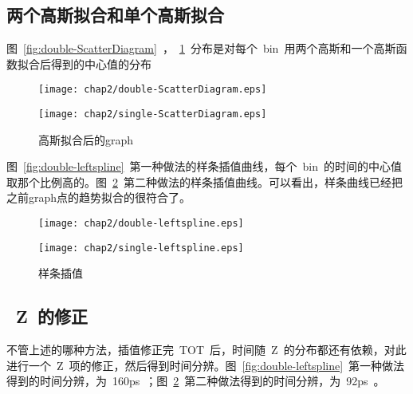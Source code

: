 \subsection{两个高斯拟合和单个高斯拟合}

图~\ref{fig:double-ScatterDiagram}~，~\ref{fig:single-ScatterDiagram}~分布是对每个~bin~用两个高斯和一个高斯函数拟合后得到的中心值的分布

\begin{figure}[!h]
\begin{minipage}[!h]{0.5\linewidth}
\texttt{[image: chap2/double-ScatterDiagram.eps]}
\label{fig:double-ScatterDiagram}
\end{minipage}%
\hfill
\begin{minipage}[!h]{0.5\linewidth}
\texttt{[image: chap2/single-ScatterDiagram.eps]}
\label{fig:single-ScatterDiagram}
\end{minipage}
\caption{高斯拟合后的graph}
\end{figure}

图~\ref{fig:double-leftspline}~第一种做法的样条插值曲线，每个~bin~的时间的中心值取那个比例高的。图~\ref{fig:single-leftspline}~第二种做法的样条插值曲线。可以看出，样条曲线已经把之前graph点的趋势拟合的很符合了。

\begin{figure}[!h]
\begin{minipage}[!h]{0.5\linewidth}
\texttt{[image: chap2/double-leftspline.eps]}
\label{fig:double-leftspline}
\end{minipage}%
\hfill
\begin{minipage}[!h]{0.5\linewidth}
\texttt{[image: chap2/single-leftspline.eps]}
\label{fig:single-leftspline}
\end{minipage}
\caption{样条插值}
\end{figure}

\subsection{~Z~的修正}
不管上述的哪种方法，插值修正完~TOT~后，时间随~Z~的分布都还有依赖，对此进行一个~Z~项的修正，然后得到时间分辨。图~\ref{fig:double-leftspline}~第一种做法得到的时间分辨，为~160ps~；图~\ref{fig:single-leftspline}~第二种做法得到的时间分辨，为~92ps~。

